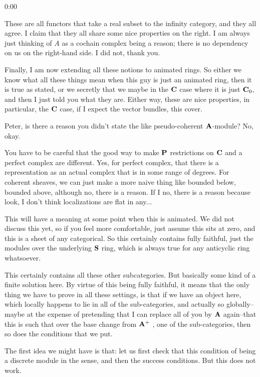 \begin{unfinished}{0:00}
{\begin{theorem}
%
These are all functors that take a real subset to the infinity category, and they all agree. I claim that they all share some nice properties on the right. I am always just thinking of $A$ as a cochain complex being a reason; there is no dependency on us on the right-hand side. I did not, thank you.

%
Finally, I am now extending all these notions to animated rings. So either we know what all these things mean when this guy is just an animated ring, then it is true as stated, or we secretly that we maybe in the $\C$ case where it is just $\C_0$, and then I just told you what they are. Either way, these are nice properties, in particular, the $\C$ case, if I expect the vector bundles, this cover.

%
\ques Peter, is there a reason you didn't state the like pseudo-coherent $\A$-module? No, okay. 

You have to be careful that the good way to make $\P$ restrictions on $\C$ and a perfect complex are different. Yes, for perfect complex, that there is a representation as an actual complex that is in some range of degrees. For coherent sheaves, we can just make a more naive thing like bounded below, bounded above, although no, there is a reason. 
If I no, there is a reason because look, I don't think localizations are flat in any...

% 
This will have a meaning at some point when this is animated. We did not discuss this yet, so if you feel more comfortable, just assume this sits at zero, and this is a sheet of any categorical. So this certainly contains fully faithful, just the modules over the underlying $\S$ ring, which is always true for any anticyclic ring whatsoever.

% 
This certainly contains all these other subcategories. But basically some kind of a finite solution here. 
By virtue of this being fully faithful, it means that the only thing we have to prove in all these settings, is that if we have an object here, which locally happens to lie in all of the sub-categories, and actually so globally--maybe at the expense of pretending that I can replace all of you by $\A$ again--that this is such that over the base change from $\A^+$ , one of the sub-categories, then so does the conditions that we put. 

%
The first idea we might have is that: let us first check that this condition of being a discrete module in the sense, and then the success conditions. But this does not work. 


\end{theorem}}
\end{unfinished}
